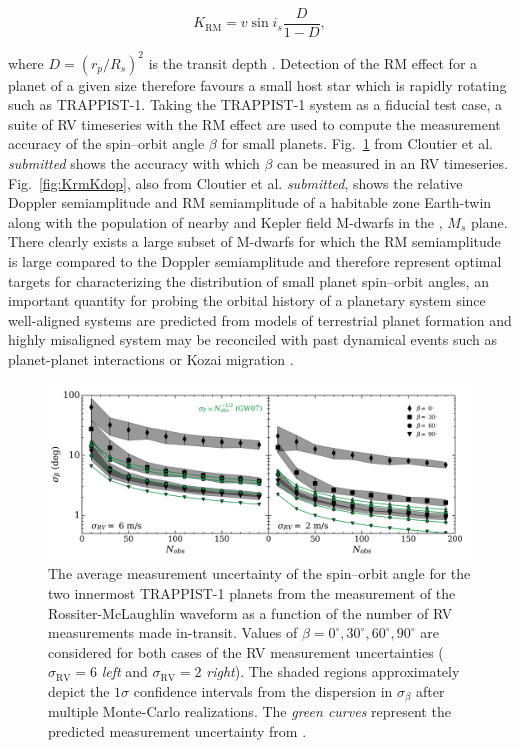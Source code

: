 \begin{equation}
K_{\mathrm{RM}} = v\sin{i_s} \frac{D}{1-D},
\end{equation}

\noindent where $D=(r_p/R_s)^2$ is the transit depth \parencite{gaudi07}. 
Detection of the RM effect for a planet of a given size therefore favours a small host 
star which is rapidly rotating such as TRAPPIST-1. Taking the TRAPPIST-1 system as a 
fiducial test case, a suite of RV timeseries with the RM effect are used to compute the 
measurement accuracy of the spin--orbit angle $\beta$ for small planets. 
Fig.~\ref{fig:beta} from Cloutier et al. \emph{submitted} shows the accuracy with which 
$\beta$ can be measured in an RV timeseries. 
Fig.~\ref{fig:KrmKdop}, also from Cloutier et al. \emph{submitted}, shows the relative 
Doppler semiamplitude and RM semiamplitude of a habitable zone Earth-twin along with the 
population of nearby and Kepler field M-dwarfs in the \vsini{}, $M_s$ plane. There clearly 
exists a large subset of M-dwarfs for which the RM semiamplitude is large compared to the 
Doppler semiamplitude and therefore represent optimal targets for characterizing the 
distribution of small planet spin--orbit angles, an important quantity for probing the 
orbital history of a planetary system since well-aligned systems are predicted from 
models of terrestrial planet formation and highly misaligned system may be reconciled with 
past dynamical events such as planet-planet interactions 
\parencite{rasio96, weidenschilling96} or Kozai migration \parencite{wu03}. \\

\begin{figure}
\centering
\includegraphics[scale=.5]{figures/betaerr3_trappist1.png}
\caption{The average measurement uncertainty of the spin--orbit angle for the two innermost 
TRAPPIST-1 planets 
from the measurement of the Rossiter-McLaughlin waveform as a function of the number of
RV measurements made in-transit. Values of
$\beta=0^{\circ},30^{\circ},60^{\circ},90^{\circ}$ are considered for both
cases of the RV measurement uncertainties ($\sigma_{\mathrm{RV}}=6$
\mps{;} \emph{left} and $\sigma_{\mathrm{RV}}=2$ \mps{;} \emph{right}). The shaded regions
approximately depict the $1 \sigma$ confidence intervals from the dispersion in $\sigma_{\beta}$ after
multiple Monte-Carlo realizations. The \emph{green curves} represent
the predicted measurement uncertainty from \cite{gaudi07}. 
\label{fig:beta}}
\end{figure}

